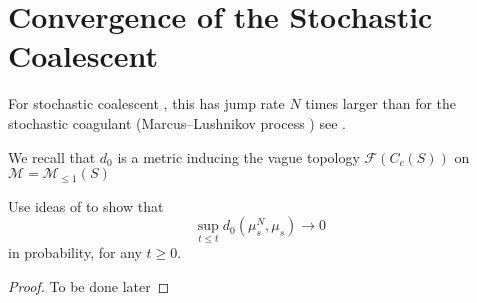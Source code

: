 \section{Convergence of the Stochastic Coalescent}
For stochastic coalescent \cite{A99}, this has jump rate $N$ times larger than for the stochastic coagulant (Marcus--Lushnikov process \cite{L78}) see \cite{N00}.

We recall that $d_0$ is a metric inducing the vague topology $\mathcal{F}(C_c(S))$ on $\mathcal{M}=\mathcal{M}_{\le 1}(S)$ 
\begin{lemma}\label{lemma: local uniform convergence of stochastic coagulent} Use ideas of \cite{N99} to show that \begin{equation}
\sup_{t\le t} d_0(\mu^N_s, \mu_s)\rightarrow 0\end{equation} in probability, for any $t\geq 0$.\end{lemma} \begin{proof} To be done later \end{proof}

